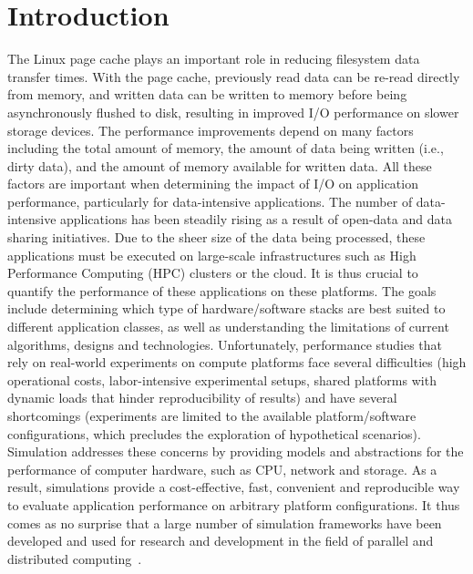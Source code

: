 \documentclass[conference]{IEEEtran}
\begin{document}
    \section{Introduction}

    The Linux page cache plays an important role in
    reducing filesystem data transfer times. With the page cache, previously
    read data can be re-read directly from memory, and written data can be written to
    memory before being asynchronously flushed to disk, resulting in improved I/O performance
    on slower storage devices. The performance improvements
    depend on many factors including the total amount of memory,
    the amount of data being written (i.e., dirty data), and the amount of memory available for
    written data. All these factors are important when determining the impact of I/O on
    application performance, particularly for data-intensive applications.
    The number of data-intensive applications has been steadily rising as a result of
    open-data and data sharing initiatives. Due to the sheer size of the data being
    processed, these applications must be executed on large-scale infrastructures
    such as High Performance Computing (HPC) clusters or the cloud.  It
    is thus crucial to quantify the performance of these applications
    on these platforms. The goals include determining which type of hardware/software
    stacks are best suited to different application classes, as well as
    understanding the limitations of current algorithms, designs and
    technologies. Unfortunately, performance
    studies that rely on real-world experiments on compute platforms
    face several difficulties (high operational costs, labor-intensive experimental setups,
    shared platforms with dynamic loads that hinder reproducibility of results) and have several shortcomings
    (experiments are limited to the available platform/software configurations, which precludes
    the exploration of hypothetical scenarios). 
    Simulation addresses these concerns by providing models
    and abstractions for the performance of computer hardware, such as
    CPU, network and storage. As a result, simulations provide a
    cost-effective, fast, convenient and reproducible way to evaluate
    application performance on arbitrary platform configurations. It thus comes
    as no surprise that a large number of simulation frameworks have been developed and used 
    for research and development in the field of parallel and distributed computing~\cite{ optorsim, gridsim, groudsim, cloudsim, nunez2012simcan,nunez2012icancloud, mdcsim, dissect_cf, cloudnetsimplusplus, fognetsimplusplus, casanova2014simgrid, ROSS, casanova2020fgcs}. 
\end{document}
